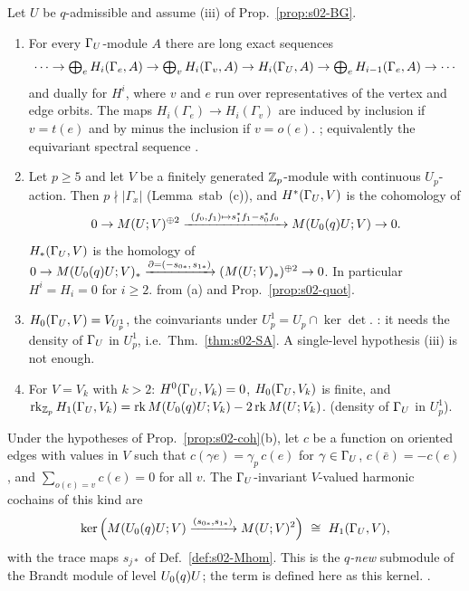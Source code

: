\begin{proposition}\label{prop:s02-coh}
Let $U$ be $q$-admissible and assume (iii) of Prop.~\ref{prop:s02-BG}.
\begin{enumerate}[label=(\alph*)]
\item For every $\Gamma_U$-module $A$ there are long exact sequences
  \[\cdots\to\textstyle\bigoplus_{e}H_i(\Gamma_e,A)\to\bigoplus_{v}H_i(\Gamma_v,A)\to H_i(\Gamma_U,A)\to
  \bigoplus_eH_{i-1}(\Gamma_e,A)\to\cdots\]
  and dually for $H^i$, where $v$ and $e$ run over representatives of the vertex and edge orbits. The maps
  $H_i(\Gamma_e)\to H_i(\Gamma_v)$ are induced by inclusion if $v=t(e)$ and by minus the inclusion if $v=o(e)$.
  \stcited{} ; equivalently the equivariant
  spectral sequence .
\item Let $p\ge5$ and let $V$ be a finitely generated $\mathbb{Z}_p$-module with continuous $U_p$-action. Then
  $p\nmid|\Gamma_x|$ (Lemma~stab~(c)), and $H^*(\Gamma_U,V)$ is the cohomology of
  \[0\to\Brandt{U}{V}^{\oplus2}\xrightarrow{\ (f_0,f_1)\mapsto s_1^*f_1-s_0^*f_0\ }\Brandt{\Uzero{q}U}{V}\to0.\]
  $H_*(\Gamma_U,V)$ is the homology of
  $0\to M(U_0(q)U;V)_*\xrightarrow{\partial=(-s_{0*},\,s_{1*})}(M(U;V)_*)^{\oplus2}\to0$.
  In particular $H^i=H_i=0$ for $i\ge2$. \stproved{} from (a) and Prop.~\ref{prop:s02-quot}.
\item $H_0(\Gamma_U,V)=V_{U_p^1}$, the coinvariants under $U_p^1=U_p\cap\ker\det$. \stpmc{}: it needs the density of
  $\Gamma_U$ in $U^1_p$, i.e.\ Thm.~\ref{thm:s02-SA}. A single-level hypothesis (iii) is not enough.
\item For $V=V_k$ with $k>2$: $H^0(\Gamma_U,V_k)=0$, $H_0(\Gamma_U,V_k)$ is finite, and
  $\operatorname{rk}_{\mathbb{Z}_p}H_1(\Gamma_U,V_k)=\operatorname{rk}M(U_0(q)U;V_k)-2\operatorname{rk}M(U;V_k)$. \stpmc{} (density of $\Gamma_U$ in $U^1_p$).
\end{enumerate}
\end{proposition}

\begin{proposition}\label{prop:s02-harm}
Under the hypotheses of Prop.~\ref{prop:s02-coh}(b), let $c$ be a function on oriented edges with values in $V$
such that $c(\gamma e)=\gamma_p\,c(e)$ for $\gamma\in\Gamma_U$, $c(\bar e)=-c(e)$, and $\sum_{o(e)=v}c(e)=0$ for all
$v$. The $\Gamma_U$-invariant $V$-valued harmonic cochains of this kind are
\[\ker\Big(\Brandt{\Uzero{q}U}{V}\xrightarrow{(s_{0*},s_{1*})}\Brandt{U}{V}^{2}\Big)\ \cong\ H_1(\GU,V),\]
with the trace maps $s_{j*}$ of Def.~\ref{def:s02-Mhom}. This is the \emph{$q$-new} submodule of the Brandt
module of level $U_0(q)U$; the term is defined here as this kernel. \stproved.
\end{proposition}

